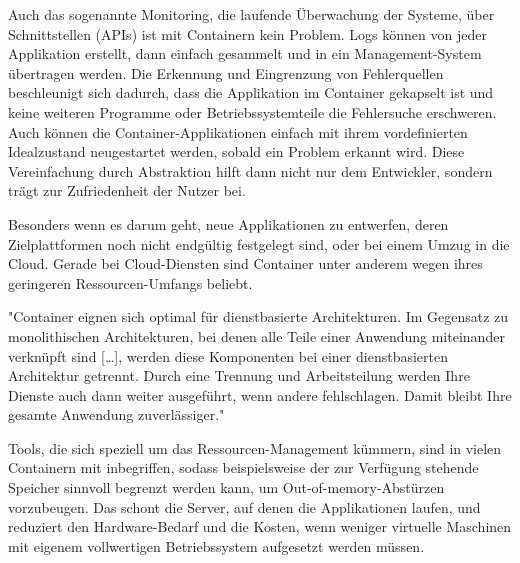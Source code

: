 Auch das sogenannte Monitoring, die laufende Überwachung der Systeme, über Schnittstellen (APIs) ist mit Containern kein Problem. Logs können von jeder Applikation erstellt, dann einfach gesammelt und in ein Management-System übertragen werden. Die Erkennung und Eingrenzung von Fehlerquellen beschleunigt sich dadurch, dass die Applikation im Container gekapselt ist und keine weiteren Programme oder Betriebssystemteile die Fehlersuche erschweren. Auch können die Container-Applikationen einfach mit ihrem vordefinierten Idealzustand neugestartet werden, sobald ein Problem erkannt wird.
Diese Vereinfachung durch Abstraktion hilft dann nicht nur dem Entwickler, sondern trägt zur Zufriedenheit der Nutzer bei. 

Besonders wenn es darum geht, neue Applikationen zu entwerfen, deren Zielplattformen noch nicht endgültig festgelegt sind, oder bei einem Umzug in die Cloud. Gerade bei Cloud-Diensten sind Container unter anderem wegen ihres geringeren Ressourcen-Umfangs beliebt.
\cite{12771285120180201}

"Container eignen sich optimal für dienstbasierte Architekturen. Im Gegensatz zu monolithischen Architekturen, bei denen alle Teile einer Anwendung miteinander verknüpft sind […], werden diese Komponenten bei einer dienstbasierten Architektur getrennt. Durch eine Trennung und Arbeitsteilung werden Ihre Dienste auch dann weiter ausgeführt, wenn andere fehlschlagen. Damit bleibt Ihre gesamte Anwendung zuverlässiger."\cite{GoogleContainers}

Tools, die sich speziell um das Ressourcen-Management kümmern, sind in vielen Containern mit inbegriffen, sodass beispielsweise der zur Verfügung stehende Speicher sinnvoll begrenzt werden kann, um Out-of-memory-Abstürzen vorzubeugen. 
Das schont die Server, auf denen die Applikationen laufen, und reduziert den Hardware-Bedarf und die Kosten, wenn weniger virtuelle Maschinen mit eigenem vollwertigen Betriebssystem aufgesetzt werden müssen.
\cite{11517836120160501}